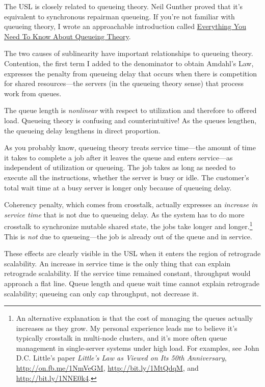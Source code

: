\documentclass{vivid_layout}
\begin{document}
The USL is closely related to queueing theory. Neil Gunther proved that it's
equivalent to synchronous repairman queueing. If you're not familiar with
queueing theory, I wrote an approachable introduction called
\href{https://www.vividcortex.com/resources/queueing-theory/}{Everything You
Need To Know About Queueing Theory}.

The two causes of sublinearity have important relationships to queueing theory.
Contention, the first term I added to the denominator to obtain Amdahl's Law,
expresses the penalty from queueing delay that occurs when there is competition
for shared resources---the servers (in the queueing theory sense) that process
work from queues.

The queue length is {\itshape nonlinear} with respect to utilization and
therefore to offered load. Queueing theory is confusing and counterintuitive! As
the queues lengthen, the queueing delay lengthens in direct proportion.

As you probably know, queueing theory treats service time---the amount of time
it takes to complete a job after it leaves the queue and enters service---as
independent of utilization or queueing. The job takes as long as needed to
execute all the instructions, whether the server is busy or idle. The customer's
total wait time at a busy server is longer only because of queueing delay.

Coherency penalty, which comes from crosstalk, actually expresses an {\itshape
increase in service time} that is not due to queueing delay. As the system has
to do more crosstalk to synchronize mutable shared state, the jobs take longer
and longer.\footnote{An alternative explanation is that the cost of managing the
queues actually increases as they grow. My personal experience leads me to
believe it's typically crosstalk in multi-node clusters, and it's more often
queue management in single-server systems under high load. For examples, see
John D.C. Little's paper {\itshape Little’s Law as Viewed on Its 50th
Anniversary}, \href{http://on.fb.me/1NmVeGM}{http://on.fb.me/1NmVeGM},
\href{http://bit.ly/1MtQdqM}{http://bit.ly/1MtQdqM}, and
\href{http://bit.ly/1NNE0k4}{http://bit.ly/1NNE0k4}.} This is {\itshape not} due
to queueing---the job is already out of the queue and in service.

These effects are clearly visible in the USL when it enters the region of
retrograde scalability. An increase in service time is the only thing that can
explain retrograde scalability. If the service time remained constant,
throughput would approach a flat line. Queue length and queue wait time cannot
explain retrograde scalability; queueing can only cap throughput, not decrease
it.
\end{document}
